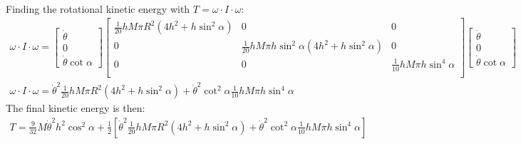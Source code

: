 \documentclass[10pt]{article}
\begin{document}
\begin{enumerate}
\begin{gather*}
    \end{gather*}
    Finding the rotational kinetic energy with $T=\omega\cdot I\cdot\omega$:
    \begin{gather*}
      \omega\cdot I\cdot\omega=
      \begin{bmatrix}
        \dot{\theta} \\
        0            \\
        \dot{\theta}\cot\alpha
      \end{bmatrix}
      \begin{bmatrix}
        \frac{1}{20} h M \pi  R^2 \left(4 h^2+h\sin^2\alpha\right) & 0                                                                  & 0                                 \\
        0                                                        & \frac{1}{20} h M \pi  h\sin^2\alpha \left(4 h^2+h\sin^2\alpha\right) & 0                                 \\
        0                                                        & 0                                                                  & \frac{1}{10} h M \pi  h\sin^4\alpha \\
      \end{bmatrix}
      \begin{bmatrix}
        \dot{\theta} \\
        0            \\
        \dot{\theta}\cot\alpha
      \end{bmatrix}\\
      \omega\cdot I\cdot\omega=\dot{\theta}^2 \frac{1}{20} h M \pi  R^2 \left(4 h^2+h\sin^2\alpha\right)+\dot{\theta}^2\cot^2\alpha\frac{1}{10} h M \pi  h\sin^4\alpha
    \end{gather*}
    The final kinetic energy is then:
    \begin{gather*}
      T=\frac{9}{32}M\dot{\theta}^2 h^2\cos^2\alpha+\frac{1}{2}\left[\dot{\theta}^2 \frac{1}{20} h M \pi  R^2 \left(4 h^2+h\sin^2\alpha\right)+\dot{\theta}^2\cot^2\alpha\frac{1}{10} h M \pi  h\sin^4\alpha\right]
    \end{gather*}
  \end{enumerate}
\end{document}
